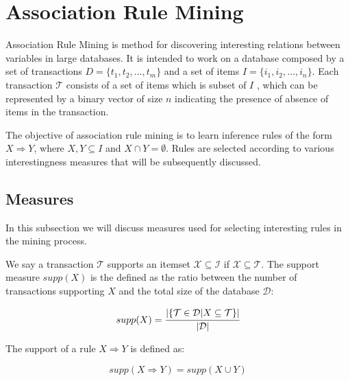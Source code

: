 
\section{Association Rule Mining}
\cite{Agrawal:1993:MAR:170036.170072}
\cite{Hipp00algorithmsfor}

Association Rule Mining is method for discovering interesting relations between variables in large databases. It is
intended to work on a database composed by a set of transactions $D=\{t_1,t_2,\ldots,t_m\}$ and a set of items
$I=\{i_1,i_2,\ldots,i_n\}$. Each transaction $\mathcal{T}$ consists of a set of items which is subset of $I$ , which can
be represented by a binary vector of size $n$ indicating the presence of absence of items in the transaction.

The objective of association rule mining is to learn inference rules of the form $X \Rightarrow Y$, where $X,Y
\subseteq I$ and $X \cap Y = \emptyset$. Rules are selected according to various interestingness measures that will be
subsequently discussed.

\subsection{Measures}

In this subsection we will discuss measures used for selecting interesting rules in the mining process.

We say a transaction $\mathcal{T}$ supports an itemset $\mathcal{X} \subseteq \mathcal{I}$ if $\mathcal{X} \subseteq
\mathcal{T}$. The support measure $supp(X)$ is the defined as the ratio between the number of transactions supporting
$X$ and the total size of the database $\mathcal{D}$:

\begin{equation}
 supp(X)=\cfrac{|\{ \mathcal{T} \in \mathcal{D} | X \subseteq \mathcal{T} \}|}{|\mathcal{D}|}
\end{equation}

The support of a rule $X \Rightarrow Y$ is defined as:

\begin{equation}
 supp(X \Rightarrow Y)=supp(X \cup Y)
\end{equation}


